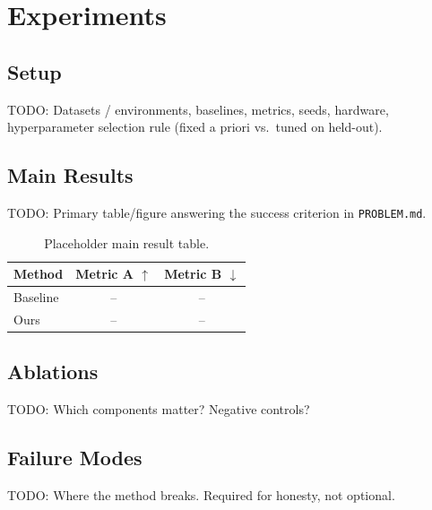\section{Experiments}
\label{sec:experiments}


\subsection{Setup}
\label{sec:exp-setup}
TODO: Datasets / environments, baselines, metrics, seeds, hardware, hyperparameter
selection rule (fixed a priori vs.\ tuned on held-out).

\subsection{Main Results}
\label{sec:main-results}
TODO: Primary table/figure answering the success criterion in \texttt{PROBLEM.md}.

\begin{table}[t]
\centering
\caption{Placeholder main result table.}
\label{tab:main}
\begin{tabular}{lcc}
\toprule
Method & Metric A $\uparrow$ & Metric B $\downarrow$ \\
\midrule
Baseline & -- & -- \\
Ours & -- & -- \\
\bottomrule
\end{tabular}
\end{table}

\subsection{Ablations}
\label{sec:ablations}
TODO: Which components matter? Negative controls?

\subsection{Failure Modes}
\label{sec:failures}
TODO: Where the method breaks. Required for honesty, not optional.
